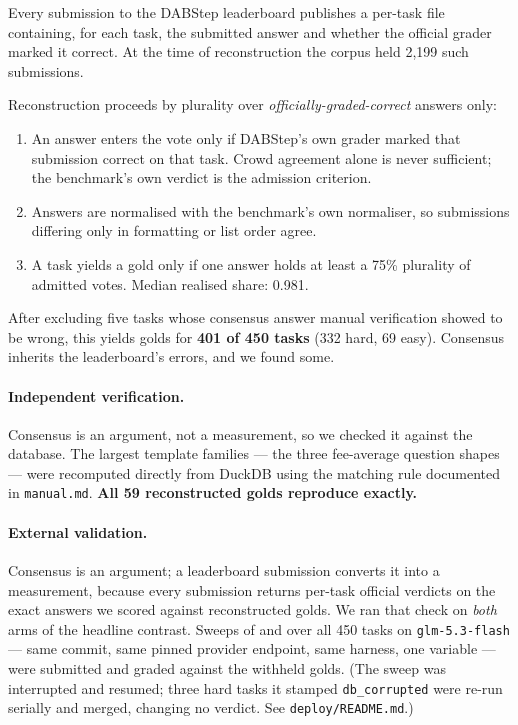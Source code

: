 Every submission to the DABStep leaderboard publishes a per-task file
containing, for each task, the submitted answer and whether the official grader
marked it correct. At the time of reconstruction the corpus held 2{,}199 such
submissions.

Reconstruction proceeds by plurality over \emph{officially-graded-correct}
answers only:

\begin{enumerate}
\itemsep2pt
\item An answer enters the vote only if DABStep's own grader marked that
      submission correct on that task. Crowd agreement alone is never
      sufficient; the benchmark's own verdict is the admission criterion.
\item Answers are normalised with the benchmark's own normaliser, so
      submissions differing only in formatting or list order agree.
\item A task yields a gold only if one answer holds at least a 75\% plurality
      of admitted votes. Median realised share: 0.981.
\end{enumerate}

After excluding five tasks whose consensus answer manual verification showed
to be wrong, this yields golds for \textbf{401 of 450 tasks} (332 hard, 69
easy). Consensus inherits the leaderboard's errors, and we found some.

\paragraph{Independent verification.} Consensus is an argument, not a
measurement, so we checked it against the database. The largest template
families --- the three fee-average question shapes --- were recomputed
directly from DuckDB using the
matching rule documented in \texttt{manual.md}. \textbf{All 59 reconstructed
golds reproduce exactly.}

\paragraph{External validation.}\label{par:external} Consensus is an argument;
a leaderboard submission converts it into a measurement, because every
submission returns per-task official verdicts on the exact answers we scored
against reconstructed golds. We ran that check on \emph{both} arms of the
headline contrast. Sweeps of \armC{} and \armM{} over all 450 tasks on
\texttt{glm-5.3-flash} --- same commit, same pinned provider endpoint, same
harness, one variable --- were submitted and graded against the withheld
golds. (The \armM{} sweep was interrupted and resumed; three hard tasks it
stamped \texttt{db\_corrupted} were re-run serially and merged, changing no
verdict. See \texttt{deploy/README.md}.)

